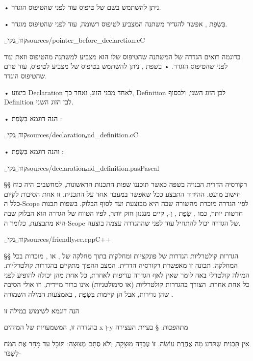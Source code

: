 \begin{enumerate}
• ניתן להשתמש בשם של טיפוס עוד לפני שהטיפוס הוגדר.
\begin{itemize}
• בִּשְׂפַת , אפשר להגדיר משתנה המצביע לטיפוס רשומה, עוד לפני שהטיפוס מוגדר.

␣קוד␣נקי{sources/pointer_before_declaretion.c}{C}

 בדוגמה רואים הגדרה של המשתנה  שהטיפוס שלו הוא מצביע למשתנה מהטיפוס  וזאת עוד לפני שהטיפוס  הוגדר.
• בשפת , ניתן להשתמש בטיפוס של מצביע לטיפוס, עוד טרם שהטיפוס הוגדר.
\end{itemize}
• ביצוע Declaration לאחד מבני הזוג, ואחר כך, Definition לבן הזוג השני, ולבסוף Definition לבן הזוג השני.
\begin{itemize}
• הנה דוגמא בִּשְׂפַת :

␣קוד␣נקי{sources/declarationₐnd_definition.c}{C}

• והנה דוגמא בִּשְׂפַת :

␣קוד␣נקי{sources/declarationₐnd_definition.pas}{Pascal}

\end{itemize}
\end{enumerate}

§§ רקורסיה הדדית הבנויה בשפה
כאשר תוכננו שפות התכנות הראשונות, למחשבים היה כוח חישוב מועט. ההידור התבצע ככל שאפשר במעבר אחד על התכנית. זו אחת הסיבות לקיום כלל ה-Scope לפיו הגדרה מוכרת מהשורה שבה היא מבוצעת ועד לסוף הבלוק. בשפות תכנות חדשות יותר, כמו , שְׂפַת , וְ-, קיים מנגנון חזק יותר, לפיו הטווח של הגדרה הוא הבלוק שבה היא מתבצעת, כלומר ה-Scope של הגדרה יכול להתחיל עוד לפני שההגדרה עצמה בוצעה.

␣קוד␣נקי{sources/friendlyᵣec.cpp}{C++}

§§ הגדרות קולטרליות
הגדרות של פונקציות ומחלקות בתוך מחלקה של , או , מוכרות בכל המחלקה.
תכונה זו מאפשרת רקורסיה הדדית. המצב ההפוך מתקיים בהגדרות קולטרליות. המילה
קולטרלי באה לומר שאין לאף הגדרה עדיפות לאחרת, כל אחת מהן יכולה להופיע לפני כל
אחת אחרת. הצורך בהגדרות קולטרליות (או סימולטניות) אינו ברור מיידית, וזו אולי
הסיבה שהן נדירות, אבל הן קיימות בִּשְׂפַת , באמצעות המילה השמורה .

הנה דוגמא לשימוש במילה זו
\begin{center}
\end{center}

בהגדרה זו, המשמעויות של המזהים x וְ-y מתהפכות.
§ בעיית העצירה

\leavevmode
\newline
אֵין תָּכְנִית שֶתֵּדַע מָה אֲחֶרֶת עוֹשָׂה.
זוֹ עֻבְדָּה מוּצָקָה, וְלֹא סְתָם מְצוּצָה:
תּוּכָל עַד מָחָר אֶת הַמֹּח לִשְבֹּר-


